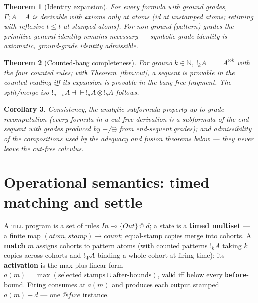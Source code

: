 \documentclass[11pt]{article}
\makeatletter
\newcommand{\lax}[2]{\{#1\}\mathbin{@}#2}       %
\newcommand{\gbang}[1]{{!}_{#1}}                 %
\newcommand{\res}{\mathbin{\ominus}}             %
\newcommand{\loli}{\multimap}                    %
\newcommand{\tensor}{\otimes}                    %
\newcommand{\NN}{\mathbb{N}}                     %
\newcommand{\till}{\textsc{till}}                %
\newtheorem{theorem}{Theorem}[section]
\newtheorem{corollary}[theorem]{Corollary}
\theoremstyle{definition}
\theoremstyle{remark}
\makeatother
\begin{document}
\begin{theorem}[Identity expansion]
\label{thm:id-expand}
For every formula with ground grades, $\Gamma; A \vdash A$ is derivable with
axioms only at atoms (id at unstamped atoms; retiming with reflexive $t \leq t$
at stamped atoms).  For non-ground (pattern) grades the primitive general
identity remains necessary --- symbolic-grade identity is axiomatic,
ground-grade identity admissible.
\end{theorem}

\begin{theorem}[Counted-bang completeness]
\label{thm:counted-bang}
For ground $k \in \NN$, $\gbang{k} A \dashv\vdash A^{\tensor k}$ with the four
counted rules; with Theorem~\ref{thm:cut}, a sequent is provable in the counted
reading iff its expansion is provable in the bang-free fragment.  The
split/merge iso $\gbang{a+b} A \dashv\vdash \gbang{a} A \tensor \gbang{b} A$
follows.
\end{theorem}

\begin{corollary}
\label{cor:misc}
Consistency; the analytic subformula property up to grade recomputation (every
formula in a cut-free derivation is a subformula of the end-sequent with grades
produced by $+$/$\res$ from end-sequent grades); and admissibility of the
compositions used by the adequacy and fusion theorems below --- they never leave
the cut-free calculus.
\end{corollary}

\section{Operational semantics: timed matching and settle}
\label{sec:opsem}

A \till{} program is a set of rules $\mathit{In} \loli \lax{\mathit{Out}}{d}$;
a state is a \textbf{timed multiset} --- a finite map $(\mathit{atom},
\mathit{stamp}) \to \mathit{count}$; equal-stamp copies merge into cohorts.  A
\textbf{match} $m$ assigns cohorts to pattern atoms (with counted patterns
$\gbang{k} A$ taking $k$ copies across cohorts and $\gbang{W} A$ binding a
whole cohort at firing time); its \textbf{activation} is the max-plus linear
form $a(m) = \max(\text{selected stamps} \cup \text{after-bounds})$, valid iff
below every \texttt{before}-bound.  Firing consumes at $a(m)$ and produces each
output stamped $a(m)+d$ --- one $\mathit{@fire}$ instance.
\end{document}
